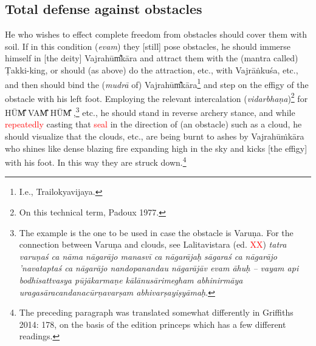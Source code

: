 \documentclass[11pt]{book}
\makeatletter
\def\fakesc#1{%
  \begingroup%
  \xdef\fake@name{\csname\curr@fontshape/\f@size\endcsname}%
  \fontsize{1.3\fontdimen8\fake@name}{\baselineskip}\selectfont%
  \uppercase{#1}%
  \endgroup%
}
\newcommand{\mantra}[1]{\fakesc{#1}}
\newcommand{\red}[1]{\textcolor{red}{#1}}
\newcommand{\skt}[1]{\emph{#1}}
\makeatother
\begin{document}
\subsection{Total defense against obstacles}
He who wishes to effect complete freedom from obstacles should cover them with soil. If in this condition (\skt{evam}) they [still] pose obstacles, he should immerse himself in [the deity]
Vajrahūm̐kāra and attract them with the (mantra called) Ṭakki-king, or should (as above) do the attraction, etc., with Vajrāṅkuśa, etc., and then should bind the (\skt{mudrā} of) Vajrahūm̐kāra\footnote{I.e., Trailokyavijaya.} and step on the effigy of the obstacle with his left foot. Employing the relevant intercalation (\skt{vidarbhaṇa})\footnote{On this technical term, %
Padoux 1977.} for \mantra{hūm̐ vam̐ hūm̐},\footnote{The example is the one to be used in case the obstacle is Varuṇa. For the connection between Varuṇa and clouds, see Lalitavistara (ed. \red{XX}) \skt{tatra varuṇaś ca nāma nāgarājo manasvī ca nāgarājaḥ sāgaraś ca nāgarājo 'navataptaś ca nāgarājo nandopanandau nāgarājāv evam āhuḥ – vayam api bodhisattvasya pūjākarmaṇe kālānusārimegham abhinirmāya uragasāracandanacūrṇavarṣam abhivarṣayiṣyāmaḥ}.} etc., he should stand in reverse archery stance, and while \red{repeatedly} casting that \red{seal} in the direction of (an obstacle) such as a cloud, he should visualize that the clouds, etc., are being burnt to ashes by Vajrahūṁkāra who shines like dense blazing fire expanding high in the sky and kicks [the effigy] with his foot. In this way they are struck down.\footnote{The preceding paragraph was translated somewhat differently in Griffiths 2014: 178, on the basis of the edition princeps which has a few different readings.}%
\end{document}
